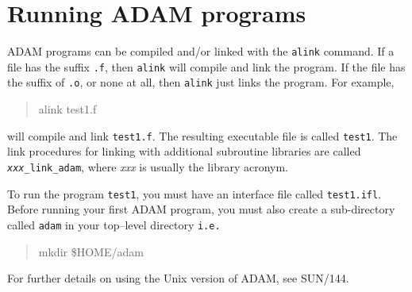 \section{Running ADAM programs}

ADAM programs can be compiled and/or linked with the {\tt alink} command. If
a file has the suffix  {\tt .f}, then {\tt alink} will compile
and link the program. If the file has the suffix of {\tt .o}, or
none at all, then {\tt alink} just links the program. For example, 

\begin{quote}\tt

alink test1.f

\end{quote}

will compile and link {\tt test1.f}. The resulting executable file is 
called {\tt test1}. The link procedures for linking with additional 
subroutine libraries 
are called {\tt{\em xxx}\_link\_adam}, where {\em xxx\/} is usually 
the library acronym.

To run the program {\tt test1}, you must have an interface file called 
{\tt test1.ifl}. 
Before running your first ADAM program, you must also create a sub-directory
called {\tt adam} in your top--level directory {\tt i.e.}

\begin{quote}\tt
 
mkdir \$HOME/adam
 
\end{quote}

For further details on using the Unix version of ADAM, see SUN/144.



